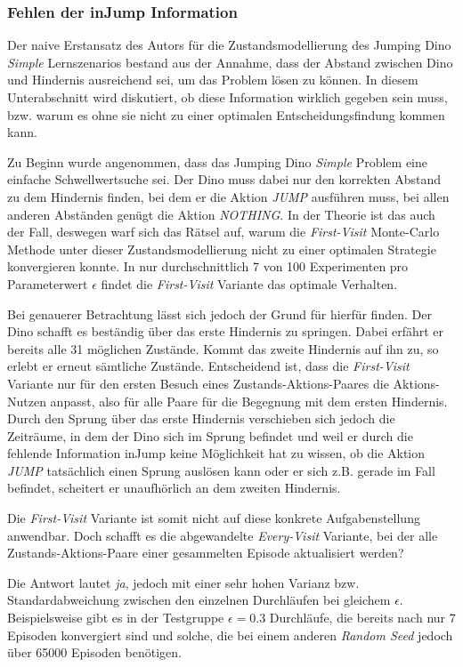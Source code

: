 \subsubsection*{Fehlen der \glqq inJump\grqq{} Information}
Der naive Erstansatz des Autors für die Zustandsmodellierung des Jumping Dino \textit{Simple} Lernszenarios bestand aus der Annahme, dass der Abstand zwischen Dino und Hindernis ausreichend sei, um das Problem lösen zu können. In diesem Unterabschnitt wird diskutiert, ob diese Information wirklich gegeben sein muss, bzw. warum es ohne sie nicht zu einer optimalen Entscheidungsfindung kommen kann.
\par 
Zu Beginn wurde angenommen, dass das Jumping Dino \textit{Simple} Problem eine einfache Schwellwertsuche sei. Der Dino muss dabei nur den korrekten Abstand zu dem Hindernis finden, bei dem er die Aktion \textit{JUMP} ausführen muss, bei allen anderen Abständen genügt die Aktion \textit{NOTHING}. In der Theorie ist das auch der Fall, deswegen warf sich das Rätsel auf, warum die \textit{First-Visit} Monte-Carlo Methode unter dieser Zustandsmodellierung nicht zu einer optimalen Strategie konvergieren konnte. In nur durchschnittlich 7 von 100 Experimenten pro Parameterwert $\epsilon$ findet die \textit{First-Visit} Variante das optimale Verhalten.
\par 
Bei genauerer Betrachtung lässt sich jedoch der Grund für hierfür finden. Der Dino schafft es beständig über das erste Hindernis zu springen. Dabei erfährt er bereits alle 31 möglichen Zustände. Kommt das zweite Hindernis auf ihn zu, so erlebt er erneut sämtliche Zustände. Entscheidend ist, dass die \textit{First-Visit} Variante nur für den ersten Besuch eines Zustands-Aktions-Paares die Aktions-Nutzen anpasst, also für alle Paare für die Begegnung mit dem ersten Hindernis. Durch den Sprung über das erste Hindernis verschieben sich jedoch die Zeiträume, in dem der Dino sich im Sprung befindet und weil er durch die fehlende Information \glqq inJump\grqq{} keine Möglichkeit hat zu wissen, ob die Aktion \textit{JUMP} tatsächlich einen Sprung auslösen kann oder er sich z.B. gerade im Fall befindet, scheitert er unaufhörlich an dem zweiten Hindernis.
\par 
Die \textit{First-Visit} Variante ist somit nicht auf diese konkrete Aufgabenstellung anwendbar. Doch schafft es die abgewandelte \textit{Every-Visit} Variante, bei der alle Zustands-Aktions-Paare einer gesammelten Episode aktualisiert werden? \par 
Die Antwort lautet \textit{ja}, jedoch mit einer sehr hohen Varianz bzw. Standardabweichung zwischen den einzelnen Durchläufen bei gleichem $\epsilon$. Beispielsweise gibt es in der Testgruppe $\epsilon = 0.3$ Durchläufe, die bereits nach nur 7 Episoden konvergiert sind und solche, die bei einem anderen \textit{Random Seed} jedoch über 65000 Episoden benötigen.

